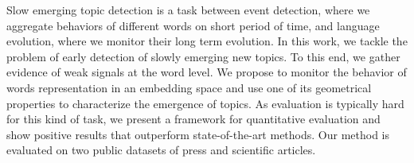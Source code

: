 Slow emerging topic detection is a task between event detection, where we aggregate behaviors of different words on short period of time, and language evolution, where we monitor their long term evolution. In this work, we tackle the problem of early detection of slowly emerging new topics. To this end, we gather evidence of weak signals at the word level. We propose to monitor the behavior of words representation in an embedding space and use one of its geometrical properties to characterize the emergence of topics. As evaluation is typically hard for this kind of task, we present a framework for quantitative evaluation and show positive results that outperform state-of-the-art methods. Our method is evaluated on two public datasets of press and scientific articles.
